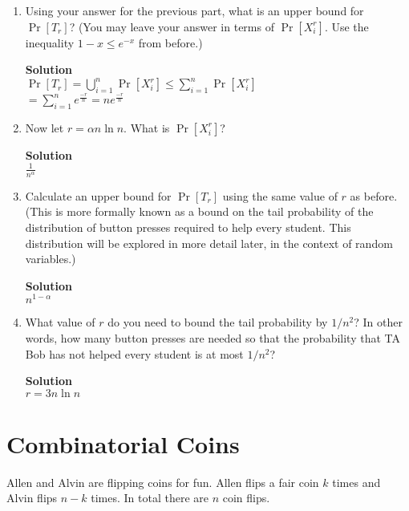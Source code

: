 \documentclass[11pt]{article}
\newcommand*{\Question}[1]{\section{#1}}
\newenvironment{Parts}{\begin{enumerate}[label=(\alph*)]}{\end{enumerate}}
\newcommand*{\Part}{\item}
\begin{document}
\begin{Parts}
	\Part Using your answer for the previous part, what is an upper bound for $\Pr[T_r]$? (You may leave your answer in terms of $\Pr[X_i^r]$. Use the inequality $1-x \leq e^{-x}$ from before.)
\begin{mdframed} \textbf{Solution} \\
$\Pr[T_r] = \bigcup\limits_{i=1}^{n}\Pr[X_i^r] \leq \sum_{i=1}^{n}\Pr[X_i^r]$ \\
$=\sum_{i=1}^{n}e^{\frac{-r}{n}}=ne^{\frac{-r}{n}}$
\end{mdframed}

	\Part Now let $r = \alpha n \ln n$. What is $\Pr[X_i^r]$?
\begin{mdframed} \textbf{Solution} \\
$\frac{1}{n^\alpha}$
\end{mdframed}

	\Part Calculate an upper bound for $\Pr[T_r]$ using the same value of $r$ as before. (This is more formally known as a bound on the tail probability of the distribution of button presses required to help every student. This distribution will be explored in more detail later, in the context of random variables.)
\begin{mdframed} \textbf{Solution} \\
$n^{1-\alpha}$
\end{mdframed}

	\Part What value of $r$ do you need to bound the tail probability by $1/n^2$? In other words, how many button presses are needed so that the probability that TA Bob has not helped every student is at most $1/n^2$?
\begin{mdframed} \textbf{Solution} \\
$r = 3n\ln{n}$
\end{mdframed}
\end{Parts}


\Question{Combinatorial Coins}

Allen and Alvin are flipping coins for fun. Allen flips a fair coin $k$ times and Alvin flips $n-k$ times. In total there are $n$ coin flips. 
\end{document}
